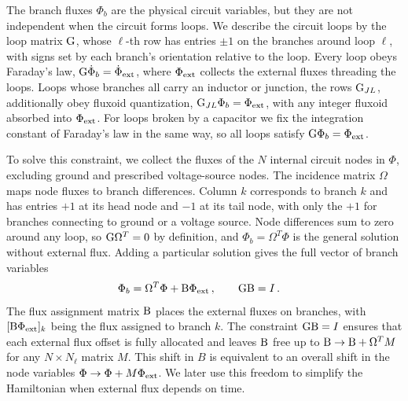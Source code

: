 The branch fluxes $\Phi_b$ are the physical circuit variables, but they are not independent when the circuit forms loops.
We describe the circuit loops by the loop matrix $\mathrm{G}$, whose $\ell$-th row has entries $\pm1$ on the branches around loop $\ell$, with signs set by each branch's orientation relative to the loop.
Every loop obeys Faraday's law, $\mathrm{G}\dot\Phi_b = \dot\Phi_{\rm ext}$, where $\Phi_{\rm ext}$ collects the external fluxes threading the loops.
Loops whose branches all carry an inductor or junction, the rows $\mathrm{G}_{JL}$, additionally obey fluxoid quantization, $\mathrm{G}_{JL}\Phi_b = \Phi_{\rm ext}$, with any integer fluxoid absorbed into $\Phi_{\rm ext}$.
For loops broken by a capacitor we fix the integration constant of Faraday's law in the same way, so all loops satisfy $\mathrm{G}\Phi_b=\Phi_{\rm ext}$.

To solve this constraint, we collect the fluxes of the $N$ internal circuit nodes in $\Phi$, excluding ground and prescribed voltage-source nodes.
The incidence matrix $\Omega$ maps node fluxes to branch differences.
Column $k$ corresponds to branch $k$ and has entries $+1$ at its head node and $-1$ at its tail node, with only the $+1$ for branches connecting to ground or a voltage source.
Node differences sum to zero around any loop, so $\mathrm{G}\Omega^T=0$ by definition, and $\Phi_b = \Omega^T\Phi$ is the general solution without external flux.
Adding a particular solution gives the full vector of branch variables
\begin{align}
    \Phi_b &= \Omega^T\Phi + \mathrm{B}\Phi_{\rm ext}\,, \qquad \mathrm{G}\mathrm{B}=I\,.
    \label{eq:branch_flux_main}
\end{align}
The flux assignment matrix $\mathrm{B}$ places the external fluxes on branches, with $[\mathrm{B}\Phi_{\rm ext}]_k$ being the flux assigned to branch $k$.
The constraint $\mathrm{G}\mathrm{B}=I$ ensures that each external flux offset is fully allocated and leaves $\mathrm{B}$ free up to $\mathrm{B}\to\mathrm{B}+\Omega^TM$ for any $N\times N_\ell$ matrix $M$.
This shift in $B$ is equivalent to an overall shift in the node variables $\Phi\to\Phi+M\Phi_{\rm ext}$.
We later use this freedom to simplify the Hamiltonian when external flux depends on time.

